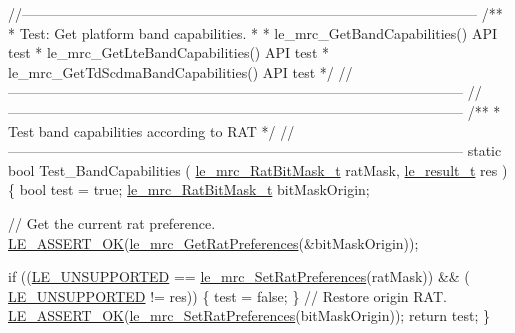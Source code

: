 \begin{DoxyCodeInclude}
\textcolor{comment}{//--------------------------------------------------------------------------------------------------}\textcolor{comment}{}
\textcolor{comment}{/**}
\textcolor{comment}{ * Test: Get platform band capabilities.}
\textcolor{comment}{ *}
\textcolor{comment}{ * le\_mrc\_GetBandCapabilities() API test}
\textcolor{comment}{ * le\_mrc\_GetLteBandCapabilities() API test}
\textcolor{comment}{ * le\_mrc\_GetTdScdmaBandCapabilities() API test}
\textcolor{comment}{ */}
\textcolor{comment}{//--------------------------------------------------------------------------------------------------}
\textcolor{comment}{//--------------------------------------------------------------------------------------------------}\textcolor{comment}{}
\textcolor{comment}{/**}
\textcolor{comment}{ * Test band capabilities according to RAT}
\textcolor{comment}{ */}
\textcolor{comment}{//--------------------------------------------------------------------------------------------------}
\textcolor{keyword}{static} \textcolor{keywordtype}{bool} Test\_BandCapabilities
(
    \hyperlink{le__mrc__interface_8h_af643c7005da7f2466302eebdf7a29d93}{le\_mrc\_RatBitMask\_t} ratMask,
    \hyperlink{le__basics_8h_a1cca095ed6ebab24b57a636382a6c86c}{le\_result\_t} res
)
\{
    \textcolor{keywordtype}{bool} test = \textcolor{keyword}{true};
    \hyperlink{le__mrc__interface_8h_af643c7005da7f2466302eebdf7a29d93}{le\_mrc\_RatBitMask\_t} bitMaskOrigin;

    \textcolor{comment}{// Get the current rat preference.}
    \hyperlink{le__log_8h_a7cd2daa3d4af1de4d29e0eed95187484}{LE\_ASSERT\_OK}(\hyperlink{le__mrc__interface_8h_ae9fa8655738c63e392c8dcc862bdb1d5}{le\_mrc\_GetRatPreferences}(&bitMaskOrigin));

    \textcolor{keywordflow}{if} ((\hyperlink{le__basics_8h_a1cca095ed6ebab24b57a636382a6c86ca5377262702e8434207b03533259e0c5f}{LE\_UNSUPPORTED} == \hyperlink{le__mrc__interface_8h_a2d4abd391bc69c218538f5d8e1be4e01}{le\_mrc\_SetRatPreferences}(ratMask)) && (
      \hyperlink{le__basics_8h_a1cca095ed6ebab24b57a636382a6c86ca5377262702e8434207b03533259e0c5f}{LE\_UNSUPPORTED} != res))
    \{
        test = \textcolor{keyword}{false};
    \}
    \textcolor{comment}{// Restore origin RAT.}
    \hyperlink{le__log_8h_a7cd2daa3d4af1de4d29e0eed95187484}{LE\_ASSERT\_OK}(\hyperlink{le__mrc__interface_8h_a2d4abd391bc69c218538f5d8e1be4e01}{le\_mrc\_SetRatPreferences}(bitMaskOrigin));
    \textcolor{keywordflow}{return} test;
\}


\end{DoxyCodeInclude}
